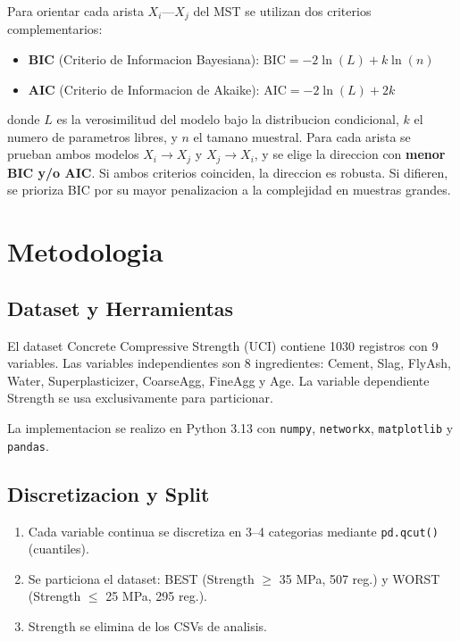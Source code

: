 \documentclass[12pt, a4paper]{article}
\begin{document}
Para orientar cada arista $X_i$---$X_j$ del MST se utilizan dos criterios
complementarios:

\begin{itemize}
    \item \textbf{BIC} (Criterio de Informacion Bayesiana):
          $\text{BIC} = -2 \ln(L) + k \ln(n)$
    \item \textbf{AIC} (Criterio de Informacion de Akaike):
          $\text{AIC} = -2 \ln(L) + 2k$
\end{itemize}

donde $L$ es la verosimilitud del modelo bajo la distribucion condicional,
$k$ el numero de parametros libres, y $n$ el tamano muestral. Para cada
arista se prueban ambos modelos $X_i \to X_j$ y $X_j \to X_i$, y se elige
la direccion con \textbf{menor BIC y/o AIC}. Si ambos criterios coinciden,
la direccion es robusta. Si difieren, se prioriza BIC por su mayor
penalizacion a la complejidad en muestras grandes.

\section{Metodologia}

\subsection{Dataset y Herramientas}

El dataset Concrete Compressive Strength (UCI) contiene 1030 registros con
9 variables. Las variables independientes son 8 ingredientes: Cement, Slag,
FlyAsh, Water, Superplasticizer, CoarseAgg, FineAgg y Age. La variable
dependiente Strength se usa exclusivamente para particionar.

La implementacion se realizo en Python 3.13 con \texttt{numpy},
\texttt{networkx}, \texttt{matplotlib} y \texttt{pandas}.

\subsection{Discretizacion y Split}

\begin{enumerate}
    \item Cada variable continua se discretiza en 3--4 categorias mediante
          \texttt{pd.qcut()} (cuantiles).
    \item Se particiona el dataset: BEST (Strength $\ge$ 35 MPa, 507 reg.)
          y WORST (Strength $\le$ 25 MPa, 295 reg.).
    \item Strength se elimina de los CSVs de analisis.
\end{enumerate}
\end{document}
